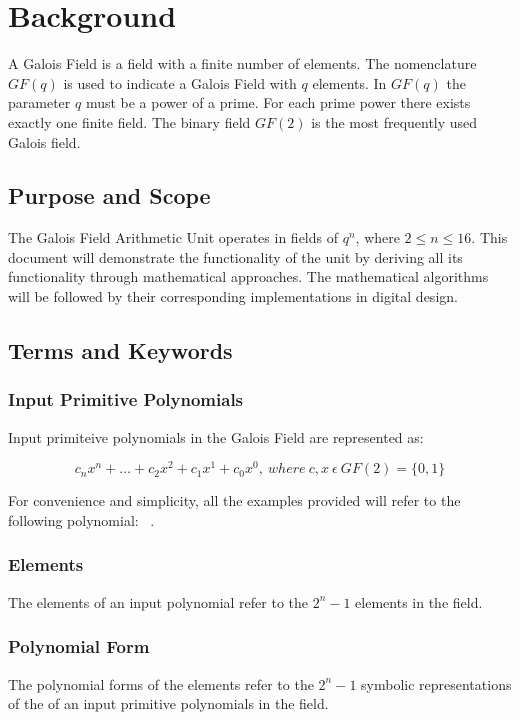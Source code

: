 \section{Background} A Galois Field is a field with a finite number of
elements. The nomenclature $GF(q)$ is used to indicate a Galois Field with
$q$ elements. In $GF(q)$ the parameter $q$ must be a power of a prime. For
each prime power there exists exactly one finite field. The binary field
$GF(2)$ is the most frequently used Galois field.

    \subsection{Purpose and Scope} The Galois Field Arithmetic Unit
    operates in fields of $q^n$, where $2 \leq n \leq 16$. This document
    will demonstrate the functionality of the unit by deriving all its
    functionality through mathematical approaches. The mathematical
    algorithms will be followed by their corresponding implementations in
    digital design.

    \subsection{Terms and Keywords}

        \subsubsection{Input Primitive Polynomials} Input primiteive
        polynomials in the Galois Field are represented as:

        \[ c_{n}x^{n}+\ldots+c_{2}x^{2}+c_{1}x^{1}+c_{0}x^{0}, \ where \
        c,x \ \epsilon \ GF(2)=\{0,1\} \]

        For convenience and simplicity, all the examples provided will
        refer to the following polynomial: \examplepoly~.

        \subsubsection{Elements} The elements of an input polynomial refer
        to the $2^{n}-1$ elements in the field.

        \subsubsection{Polynomial Form} The polynomial forms of the
        elements refer to the $2^{n}-1$ symbolic representations of the of
        an input primitive polynomials in the field.

    \newpage
